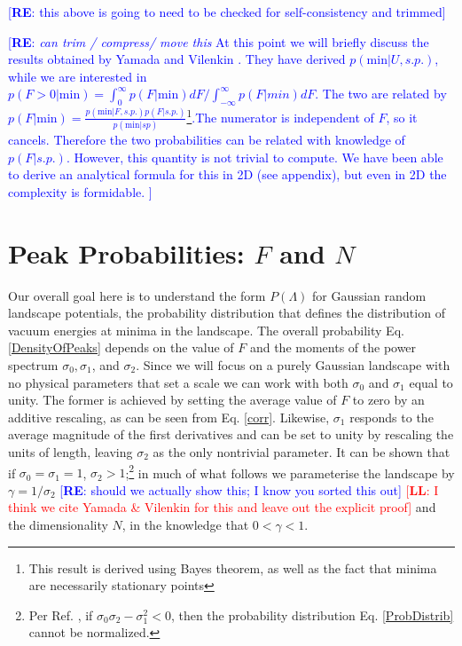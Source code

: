 \documentclass[12pt]{article}
\newcommand{\re}[1]{\textcolor{blue}{[{\bf RE}: #1]}}
\newcommand{\lfl}[1]{\textcolor{red}{[{\bf LL}: #1]}}
\begin{document}
\re{this above is going to need to be checked for self-consistency and trimmed}

\re{{\it can trim / compress/ move this} At this point we will briefly discuss the results obtained by Yamada and Vilenkin \cite{Yamada2018}. They have derived $p(\mathrm{min}|U, s.p.)$, while we are interested in $p(F>0|\mathrm{min})=\int^\infty_0 p(F|\mathrm{min})dF/\int^\infty_{-\infty} p(F|min)dF$. The two are related by $p(F|\mathrm{min})= \frac{p(\mathrm{min}|F, s.p.)p(F|s.p.)}{p(\mathrm{min}|sp)}$\footnote{This result is derived using Bayes theorem, as well as the fact that minima are necessarily stationary points}.The numerator is independent of $F$, so it cancels. Therefore the two probabilities can be related with knowledge of $p(F|s.p.)$. However, this quantity is not trivial to compute. We have been able to derive an analytical formula for this in 2D (see appendix), but even in 2D the complexity is formidable. }



\section{Peak Probabilities: $F$ and $N$} \label{PeakNumbers}

Our overall goal here is to understand the form $P(\Lambda)$ for  Gaussian random landscape potentials, the probability distribution that defines the distribution of vacuum energies at minima in the landscape. The overall probability Eq. \ref{DensityOfPeaks} depends on the value of $F$ and the moments of the power spectrum $\sigma_0, \sigma_1$,  and $\sigma_2$.  Since we will focus on a purely Gaussian landscape with no  physical parameters that set a scale we can work with both $\sigma_0$ and $\sigma_1$ equal to unity. The former is achieved by setting the average value of $F$ to zero by an additive rescaling, as can be seen from  Eq. \ref{corr}. Likewise, $\sigma_1$ responds to the average magnitude of the first derivatives and can be set to unity by rescaling the units of length, leaving $\sigma_2$ as the only nontrivial parameter. It can be shown that if $\sigma_0=\sigma_1=1$, $\sigma_2>1$;\footnote{Per Ref. \cite{Yamada2018}, if $\sigma_0\sigma_2 - \sigma_1^2 < 0$, then the probability distribution Eq. \ref{ProbDistrib} cannot be normalized.} in much of what follows we  parameterise the landscape by $\gamma = 1/\sigma_2$ \re{should we actually show this; I know you sorted this out} \lfl{I think we cite Yamada \& Vilenkin for this and leave out the explicit proof} and the dimensionality $N$,  in the knowledge that $0<\gamma<1$.
\end{document}
